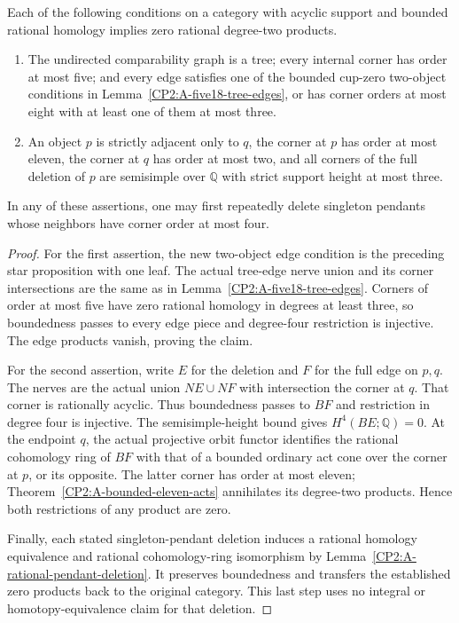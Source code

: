 \begin{corollary}
\label{CP2:A-nineteen-graph-gluing-gates}
Each of the following conditions on a category with acyclic support
and bounded rational homology implies zero rational degree-two products.
\begin{enumerate}
\item The undirected comparability graph is a tree; every internal
corner has order at most five; and every edge satisfies one of the
bounded cup-zero two-object conditions in
Lemma~\ref{CP2:A-five18-tree-edges}, or has corner orders at most eight
with at least one of them at most three.
\item An object $p$ is strictly adjacent only to $q$, the corner at
$p$ has order at most eleven, the corner at $q$ has order at most two,
and all corners of the full deletion of $p$ are semisimple over
$\mathbb Q$ with strict support height at most three.
\end{enumerate}
In any of these assertions, one may first repeatedly delete singleton
pendants whose neighbors have corner order at most four.
\end{corollary}
\begin{proof}
For the first assertion, the new two-object edge condition is the
preceding star proposition with one leaf.  The actual tree-edge nerve
union and its corner intersections are the same as in
Lemma~\ref{CP2:A-five18-tree-edges}.  Corners of order at most five have
zero rational homology in degrees at least three, so boundedness
passes to every edge piece and degree-four restriction is injective.
The edge products vanish, proving the claim.

For the second assertion, write $E$ for the deletion and $F$ for the
full edge on $p,q$.  The nerves are the actual union $NE\cup NF$
with intersection the corner at $q$.  That corner is rationally
acyclic.  Thus boundedness passes to $BF$ and restriction in degree
four is injective.  The semisimple-height bound gives $H^4(BE;\mathbb Q)=0$.
At the endpoint $q$, the actual projective orbit functor identifies
the rational cohomology ring of $BF$ with that of a bounded ordinary
act cone over the corner at $p$, or its opposite.  The latter corner
has order at most eleven; Theorem~\ref{CP2:A-bounded-eleven-acts}
annihilates its degree-two products.  Hence both restrictions of any
product are zero.

Finally, each stated singleton-pendant deletion induces a rational
homology equivalence and rational cohomology-ring isomorphism by
Lemma~\ref{CP2:A-rational-pendant-deletion}.  It preserves boundedness
and transfers the established zero products back to the original
category.  This last step uses no integral or homotopy-equivalence
claim for that deletion.
\end{proof}
